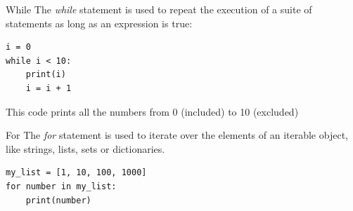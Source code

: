 \documentclass[aspectratio=169,handout]{beamer}
\begin{document}
\begin{frame}[fragile]{While}
    The \emph{while} statement is used to repeat the execution of a suite of statements as long as an expression is
    true:

    \begin{minipage}{0.49\textwidth}
        \begin{verbatim}
i = 0
while i < 10:
    print(i)
    i = i + 1
        \end{verbatim}
    \end{minipage}
    \begin{minipage}{0.49\textwidth}
    \end{minipage}

    This code prints all the numbers from 0 (included) to 10 (excluded)
\end{frame}

\begin{frame}[fragile]{For}
    The \emph{for} statement is used to iterate over the elements of an iterable object, like strings, lists, sets or
    dictionaries.

    \begin{verbatim}
my_list = [1, 10, 100, 1000]
for number in my_list:
    print(number)
    \end{verbatim}
\end{frame}

%
\end{document}
